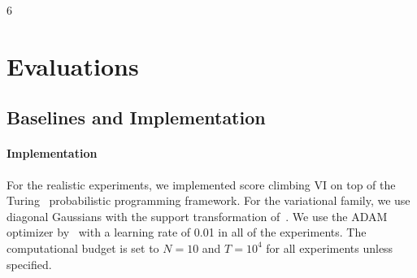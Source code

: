 6


\vspace{-0.05in}
\section{Evaluations}\label{section:eval}

\vspace{-0.05in}
\subsection{Baselines and Implementation}
\vspace{-0.05in}
\paragraph{Implementation}
For the realistic experiments, we implemented score climbing VI on top of the Turing~\citep{ge2018t} probabilistic programming framework.
For the variational family, we use diagonal Gaussians with the support transformation of~\citet{JMLR:v18:16-107}.
We use the ADAM optimizer by~\citet{kingma_adam_2015} with a learning rate of 0.01 in all of the experiments.
The computational budget is set to \(N=10\) and \(T=10^4\) for all experiments unless specified.

